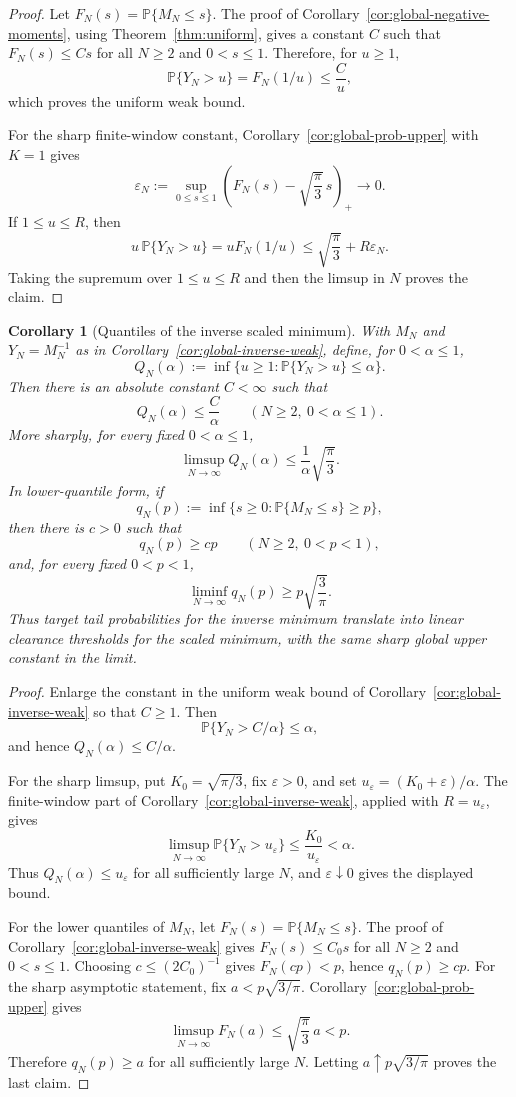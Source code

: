 \documentclass[11pt]{amsart}
\numberwithin{equation}{section}
\newtheorem{corollary}[theorem]{Corollary}
\theoremstyle{definition}
\theoremstyle{remark}
\newcommand{\Prob}{\mathbb P}
\newcommand{\eps}{\varepsilon}
\begin{document}
\begin{proof}
Let \(F_N(s)=\Prob\{M_N\le s\}\).  The proof of
Corollary~\ref{cor:global-negative-moments}, using Theorem~\ref{thm:uniform},
gives a constant \(C\) such that \(F_N(s)\le Cs\) for all \(N\ge2\) and
\(0<s\le1\).  Therefore, for \(u\ge1\),
\[
  \Prob\{Y_N>u\}=F_N(1/u)\le \frac{C}{u},
\]
which proves the uniform weak bound.

For the sharp finite-window constant, Corollary~\ref{cor:global-prob-upper}
with \(K=1\) gives
\[
  \varepsilon_N:=
  \sup_{0\le s\le1}
  \left(F_N(s)-\sqrt{\frac{\pi}{3}}\,s\right)_+
  \longrightarrow0 .
\]
If \(1\le u\le R\), then
\[
  u\,\Prob\{Y_N>u\}
  =uF_N(1/u)
  \le \sqrt{\frac{\pi}{3}}+R\varepsilon_N .
\]
Taking the supremum over \(1\le u\le R\) and then the limsup in \(N\) proves the
claim.
\end{proof}

\begin{corollary}[Quantiles of the inverse scaled minimum]
\label{cor:global-inverse-quantiles}
With \(M_N\) and \(Y_N=M_N^{-1}\) as in
Corollary~\ref{cor:global-inverse-weak}, define, for \(0<\alpha\le1\),
\[
  Q_N(\alpha):=\inf\{u\ge1:\Prob\{Y_N>u\}\le\alpha\}.
\]
Then there is an absolute constant \(C<\infty\) such that
\[
  Q_N(\alpha)\le \frac{C}{\alpha}
  \qquad(N\ge2,\ 0<\alpha\le1).
\]
More sharply, for every fixed \(0<\alpha\le1\),
\[
  \limsup_{N\to\infty} Q_N(\alpha)
  \le \frac{1}{\alpha}\sqrt{\frac{\pi}{3}}.
\]
In lower-quantile form, if
\[
  q_N(p):=\inf\{s\ge0:\Prob\{M_N\le s\}\ge p\},
\]
then there is \(c>0\) such that
\[
  q_N(p)\ge cp
  \qquad(N\ge2,\ 0<p<1),
\]
and, for every fixed \(0<p<1\),
\[
  \liminf_{N\to\infty} q_N(p)\ge p\sqrt{\frac{3}{\pi}}.
\]
Thus target tail probabilities for the inverse minimum translate into linear
clearance thresholds for the scaled minimum, with the same sharp global upper
constant in the limit.
\end{corollary}

\begin{proof}
Enlarge the constant in the uniform weak bound of
Corollary~\ref{cor:global-inverse-weak} so that \(C\ge1\).  Then
\[
  \Prob\{Y_N>C/\alpha\}\le\alpha,
\]
and hence \(Q_N(\alpha)\le C/\alpha\).

For the sharp limsup, put \(K_0=\sqrt{\pi/3}\), fix \(\eps>0\), and set
\(u_\eps=(K_0+\eps)/\alpha\).  The finite-window part of
Corollary~\ref{cor:global-inverse-weak}, applied with \(R=u_\eps\), gives
\[
  \limsup_{N\to\infty}\Prob\{Y_N>u_\eps\}
  \le \frac{K_0}{u_\eps}
  <\alpha .
\]
Thus \(Q_N(\alpha)\le u_\eps\) for all sufficiently large \(N\), and
\(\eps\downarrow0\) gives the displayed bound.

For the lower quantiles of \(M_N\), let \(F_N(s)=\Prob\{M_N\le s\}\).  The
proof of Corollary~\ref{cor:global-inverse-weak} gives \(F_N(s)\le C_0s\) for
all \(N\ge2\) and \(0<s\le1\).  Choosing \(c\le(2C_0)^{-1}\) gives
\(F_N(cp)<p\), hence \(q_N(p)\ge cp\).  For the sharp asymptotic statement,
fix \(a<p\sqrt{3/\pi}\).  Corollary~\ref{cor:global-prob-upper} gives
\[
  \limsup_{N\to\infty}F_N(a)
  \le \sqrt{\frac{\pi}{3}}\,a
  <p .
\]
Therefore \(q_N(p)\ge a\) for all sufficiently large \(N\).  Letting
\(a\uparrow p\sqrt{3/\pi}\) proves the last claim.
\end{proof}
\end{document}
